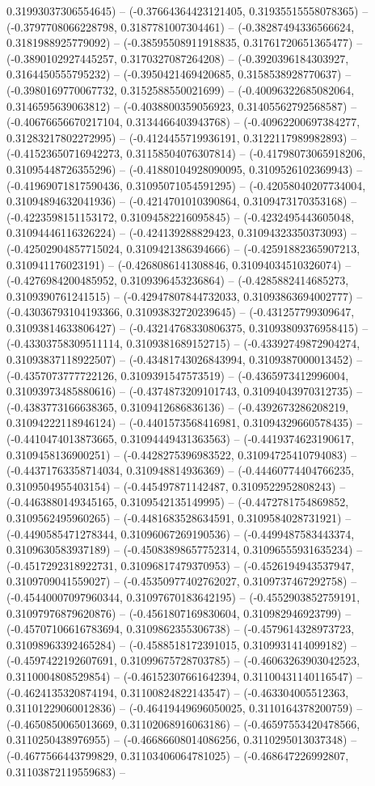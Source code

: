 0.31993037306554645) -- (-0.37664364423121405, 0.31935515558078365) -- (-0.3797708066228798, 0.3187781007304461) -- (-0.38287494336566624, 0.3181988925779092) -- (-0.38595508911918835, 0.31761720651365477) -- (-0.3890102927445257, 0.3170327087264208) -- (-0.3920396184303927, 0.3164450555795232) -- (-0.3950421469420685, 0.3158538928770637) -- (-0.3980169770067732, 0.3152588550021699) -- (-0.40096322685082064, 0.3146595639063812) -- (-0.4038800359056923, 0.31405562792568587) -- (-0.40676656670217104, 0.3134466403943768) -- (-0.40962200697384277, 0.31283217802272995) -- (-0.4124455719936191, 0.3122117989982893) -- (-0.41523650716942273, 0.31158504076307814) -- (-0.41798073065918206, 0.31095448726355296) -- (-0.41880104928090095, 0.3109526102369943) -- (-0.41969071817590436, 0.31095071054591295) -- (-0.42058040207734004, 0.31094894632041936) -- (-0.4214701010390864, 0.3109473170353168) -- (-0.4223598151153172, 0.31094582216095845) -- (-0.4232495443605048, 0.31094446116326224) -- (-0.424139288829423, 0.31094323350373093) -- (-0.42502904857715024, 0.3109421386394666) -- (-0.42591882365907213, 0.310941176023191) -- (-0.4268086141308846, 0.31094034510326074) -- (-0.4276984200485952, 0.3109396453236864) -- (-0.4285882414685273, 0.3109390761241515) -- (-0.42947807844732033, 0.31093863694002777) -- (-0.43036793104193366, 0.31093832720239645) -- (-0.431257799309647, 0.31093814633806427) -- (-0.43214768330806375, 0.31093809376958415) -- (-0.43303758309511114, 0.3109381689152715) -- (-0.43392749872904274, 0.31093837118922507) -- (-0.43481743026843994, 0.3109387000013452) -- (-0.4357073777722126, 0.3109391547573519) -- (-0.4365973412996004, 0.31093973485880616) -- (-0.4374873209101743, 0.31094043970312735) -- (-0.4383773166638365, 0.3109412686836136) -- (-0.4392673286208219, 0.31094222118946124) -- (-0.4401573568416981, 0.31094329660578435) -- (-0.4410474013873665, 0.31094449431363563) -- (-0.4419374623190617, 0.3109458136900251) -- (-0.4428275396983522, 0.31094725410794083) -- (-0.44371763358714034, 0.310948814936369) -- (-0.44460774404766235, 0.3109504955403154) -- (-0.445497871142487, 0.3109522952808243) -- (-0.4463880149345165, 0.3109542135149995) -- (-0.4472781754869852, 0.3109562495960265) -- (-0.4481683528634591, 0.3109584028731921) -- (-0.4490585471278344, 0.31096067269190536) -- (-0.4499487583443374, 0.3109630583937189) -- (-0.45083898657752314, 0.31096555931635234) -- (-0.4517292318922731, 0.31096817479370953) -- (-0.4526194943537947, 0.3109709041559027) -- (-0.45350977402762027, 0.3109737467292758) -- (-0.45440007097960344, 0.31097670183642195) -- (-0.4552903852759191, 0.31097976879620876) -- (-0.4561807169830604, 0.310982946923799) -- (-0.45707106616783694, 0.3109862355306738) -- (-0.4579614328973723, 0.31098963392465284) -- (-0.4588518172391015, 0.3109931414099182) -- (-0.4597422192607691, 0.31099675728703785) -- (-0.46063263903042523, 0.3110004808529854) -- (-0.46152307661642394, 0.31100431140116547) -- (-0.4624135320874194, 0.31100824822143547) -- (-0.463304005512363, 0.31101229060012836) -- (-0.46419449696050025, 0.3110164378200759) -- (-0.4650850065013669, 0.31102068916063186) -- (-0.46597553420478566, 0.3110250438976955) -- (-0.46686608014086256, 0.3110295013037348) -- (-0.4677566443799829, 0.31103406064781025) -- (-0.468647226992807, 0.31103872119559683) -- 